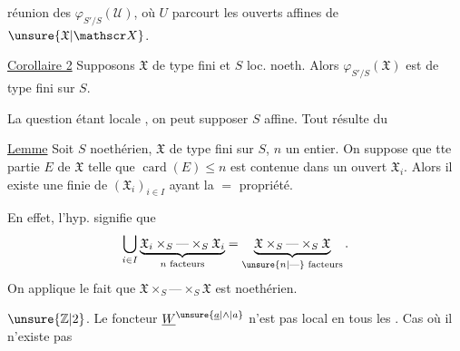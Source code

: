 réunion des $\varphi_{S'/S}(\mathcal U)$, où $U$ parcourt les ouverts affines de $\unsure{\mathfrak X|\mathscr X}$.

\uline{Corollaire 2} Supposons   $\mathfrak X$ de type fini  et $S$ loc. noeth. Alors $\varphi_{S'/S}(\mathfrak X)$ est de type fini sur $S$.

La question étant locale , on peut supposer $S$ affine. Tout résulte du

\uline{Lemme} Soit $S$ noethérien, $\mathfrak X$ de type fini sur $S$, $n$ un entier.  On suppose que tte partie  $E$ de $\mathfrak X$ telle que $\operatorname{card}(E)\leq n$ est contenue dans un ouvert  $\mathfrak X_i$. Alors il existe une  finie de $(\mathfrak X_i)_{i\in I}$ ayant la $=$ propriété.

En effet, l'hyp. signifie que
\[
\bigcup_{i\in I}
\underbrace{\mathfrak X_i\times_S\text{---}\times_S\mathfrak X_i}_{n\text{ facteurs}}
=
\underbrace{\mathfrak X\times_S\text{---}\times_S\mathfrak X}_{\unsure{n|\text{---}}\text{ facteurs}}.
\]
On applique le fait que $\mathfrak X\times_S\text{---}\times_S\mathfrak X$ est  noethérien.

$\unsure{\mathbb Z|2}$. Le foncteur $\underline W^{\unsure{\underline a|\wedge|a}}$ n'est pas local en tous les . Cas où il n'existe pas 
